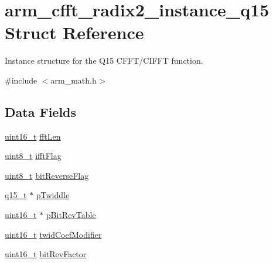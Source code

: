 \hypertarget{structarm__cfft__radix2__instance__q15}{\section{arm\-\_\-cfft\-\_\-radix2\-\_\-instance\-\_\-q15 Struct Reference}
\label{structarm__cfft__radix2__instance__q15}
}


Instance structure for the Q15 C\-F\-F\-T/\-C\-I\-F\-F\-T function.  




{\ttfamily \#include $<$arm\-\_\-math.\-h$>$}

\subsection*{Data Fields}
\begin{DoxyCompactItemize}
\item 
\hyperlink{stdint_8h_a273cf69d639a59973b6019625df33e30}{uint16\-\_\-t} \hyperlink{structarm__cfft__radix2__instance__q15_a874085647351dcf3f0de39d2b1d49744}{fft\-Len}
\item 
\hyperlink{stdint_8h_aba7bc1797add20fe3efdf37ced1182c5}{uint8\-\_\-t} \hyperlink{structarm__cfft__radix2__instance__q15_ab5c073286bdd2f6e2bf783ced36bf1de}{ifft\-Flag}
\item 
\hyperlink{stdint_8h_aba7bc1797add20fe3efdf37ced1182c5}{uint8\-\_\-t} \hyperlink{structarm__cfft__radix2__instance__q15_af8300c1f60caa21e6b44b9240ab5af19}{bit\-Reverse\-Flag}
\item 
\hyperlink{arm__math_8h_ab5a8fb21a5b3b983d5f54f31614052ea}{q15\-\_\-t} $\ast$ \hyperlink{structarm__cfft__radix2__instance__q15_a3809dd15e7cbf1a054c728cfbbb0cc5a}{p\-Twiddle}
\item 
\hyperlink{stdint_8h_a273cf69d639a59973b6019625df33e30}{uint16\-\_\-t} $\ast$ \hyperlink{structarm__cfft__radix2__instance__q15_ab88afeff6493be3c8b5e4530efa82d51}{p\-Bit\-Rev\-Table}
\item 
\hyperlink{stdint_8h_a273cf69d639a59973b6019625df33e30}{uint16\-\_\-t} \hyperlink{structarm__cfft__radix2__instance__q15_a6f2ab87fb4c568656e1f92f687b5c850}{twid\-Coef\-Modifier}
\item 
\hyperlink{stdint_8h_a273cf69d639a59973b6019625df33e30}{uint16\-\_\-t} \hyperlink{structarm__cfft__radix2__instance__q15_a8722720c542cabd41df83fe88ef4f4cb}{bit\-Rev\-Factor}
\end{DoxyCompactItemize}


